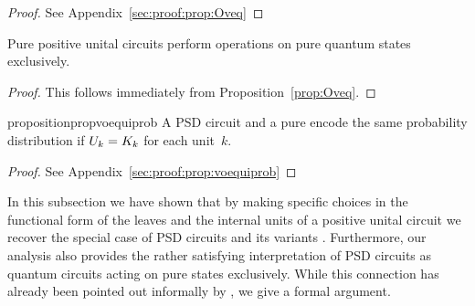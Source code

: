 \begin{proof}
	See Appendix~\ref{sec:proof:prop:Oveq}
\end{proof}



\begin{corollary}
	Pure positive unital circuits perform operations on pure quantum states exclusively.
\end{corollary}

\begin{proof}
	This follows immediately from Proposition~\ref{prop:Oveq}.
\end{proof}

\begin{restatable}{proposition}{propvoequiprob}
	\label{prop:voequiprob}
	A PSD circuit and a pure \punc encode the same probability distribution if $U_k=K_k$ for each unit~$k$.
\end{restatable}



\begin{proof}
	See Appendix~\ref{sec:proof:prop:voequiprob}
\end{proof}

In this subsection we have shown that by making specific choices in the functional form of the leaves and the internal units of a positive unital circuit we recover the special case of PSD circuits and its variants \citep{loconte2024subtractive,loconte2025sum}. Furthermore, our analysis also provides the rather satisfying interpretation of PSD circuits as quantum circuits acting on pure states exclusively. While this connection has already been pointed out informally by \citet{wangrelationship}, we give a formal argument.









